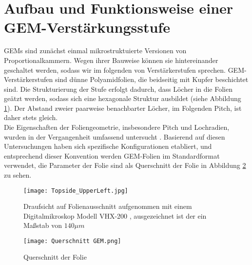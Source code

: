 \section{Aufbau und Funktionsweise einer GEM-Verstärkungsstufe} 
  GEMs sind zunächst einmal mikrostruktuierte Versionen von Proportionalkammern. Wegen ihrer Bauweise können sie hintereinander geschaltet werden, sodass wir im folgenden von Verstärkerstufen sprechen. GEM-Verstärkerstufen sind dünne Polyamidfolien, die beidseitig mit Kupfer beschichtet sind. Die Strukturierung der Stufe erfolgt dadurch, dass Löcher in die Folien geätzt werden, sodass sich eine hexagonale Struktur ausbildet (siehe Abbildung \ref{fig:Draufsicht}). Der Abstand zweier paarweise benachbarter Löcher, im Folgenden Pitch, ist daher stets gleich.\\
   Die Eigenschaften der Foliengeometrie, insbesondere Pitch und Lochradien, wurden in der Vergangenheit umfassend untersucht \cite{Sauli_Übersicht}. Basierend auf diesen Untersuchungen haben sich spezifische Konfigurationen etabliert, und entsprechend dieser Konvention werden GEM-Folien im Standardformat verwendet, die Parameter der Folie sind als Querschnitt der Folie in Abbildung \ref{fig:Querschnitt} zu sehen.

	\begin{figure}[h]
		\centering
		\texttt{[image: Topside\_UpperLeft.jpg]}
		\caption{Draufsicht auf Folienausschnitt aufgenommen mit einem Digitalmikroskop Modell VHX-200 \cite{MikroskopReinraum}, ausgezeichnet ist der ein Maßstab von $140 \si{\mu m}$}
		\label{fig:Draufsicht}
	\end{figure}

	\begin{figure}[h]
		\centering
		\texttt{[image: Querschnitt GEM.png]}
		\caption{Querschnitt der Folie}
		\label{fig:Querschnitt}
	\end{figure}
		
		
		
